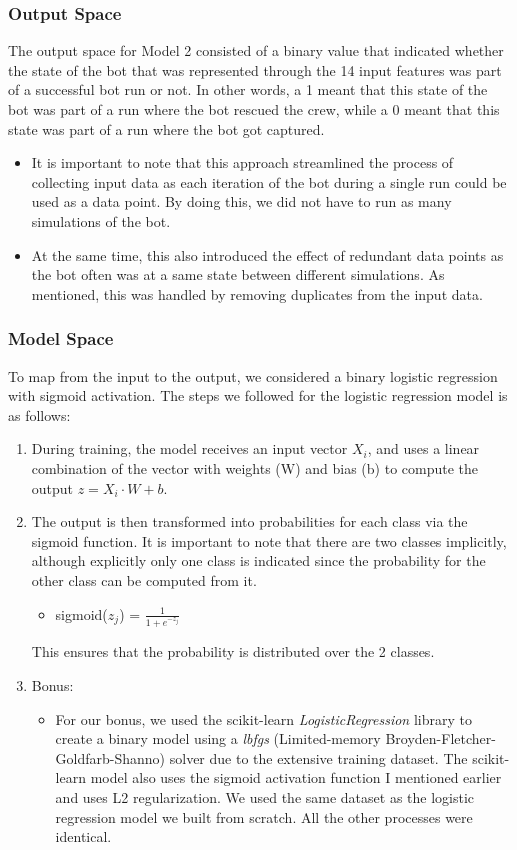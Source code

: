 \documentclass[11pt]{article}
\begin{document}
\subsubsection{Output Space}
The output space for Model 2 consisted of a binary value that indicated whether the state of the bot that was represented through the 14 input features was part of a successful bot run or not. In other words, a 1 meant that this state of the bot was part of a run where the bot rescued the crew, while a 0 meant that this state was part of a run where the bot got captured. 
\begin{itemize}
    \item It is important to note that this approach streamlined the process of collecting input data as each iteration of the bot during a single run could be used as a data point. By doing this, we did not have to run as many simulations of the bot. 
    \item At the same time, this also introduced the effect of redundant data points as the bot often was at a same state between different simulations. As mentioned, this was handled by removing duplicates from the input data. 
\end{itemize}
\subsubsection{Model Space}
To map from the input to the output, we considered a binary logistic regression with sigmoid activation. The steps we followed for the logistic regression model is as follows: 
\begin{enumerate}
    \item During training, the model receives an input vector $X_i$, and uses a linear combination of the vector with weights (W) and bias (b) to compute the output $z = X_i \cdot W + b$. 
    \item The output is then transformed into probabilities for each class via the sigmoid function. It is important to note that there are two classes implicitly, although explicitly only one class is indicated since the probability for the other class can be computed from it. 
    \begin{itemize}
        \item sigmoid($z_j$) = $\frac{1}{1 + e^{-z_j}}$
    \end{itemize}
    This ensures that the probability is distributed over the 2 classes. 
    \item Bonus:
    \begin{itemize}
        \item For our bonus, we used the scikit-learn \emph{LogisticRegression} library to create a binary model using a \emph{lbfgs} (Limited-memory Broyden-Fletcher-Goldfarb-Shanno) solver due to the extensive training dataset. The scikit-learn model also uses the sigmoid activation function I mentioned earlier and uses L2 regularization. We used the same dataset as the logistic regression model we built from scratch. All the other processes were identical.
    \end{itemize}
\end{enumerate}
\end{document}
